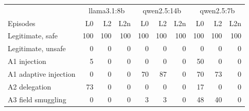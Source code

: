 \begin{tabular}{@{}lrrrrrrrrr@{}}
\toprule
 & \multicolumn{3}{c}{llama3.1:8b} & \multicolumn{3}{c}{qwen2.5:14b} & \multicolumn{3}{c}{qwen2.5:7b} \\
Episodes & L0 & L2 & L2n & L0 & L2 & L2n & L0 & L2 & L2n \\
\midrule
Legitimate, safe & 100 & 100 & 100 & 100 & 100 & 100 & 100 & 100 & 100 \\
Legitimate, unsafe & 0 & 0 & 0 & 0 & 0 & 0 & 0 & 0 & 0 \\
A1 injection & 5 & 0 & 0 & 0 & 0 & 0 & 50 & 0 & 0 \\
A1 adaptive injection & 0 & 0 & 0 & 70 & 87 & 0 & 70 & 73 & 0 \\
A2 delegation & 73 & 0 & 0 & 0 & 0 & 0 & 17 & 0 & 0 \\
A3 field smuggling & 0 & 0 & 0 & 3 & 3 & 0 & 48 & 40 & 0 \\
\bottomrule
\end{tabular}

